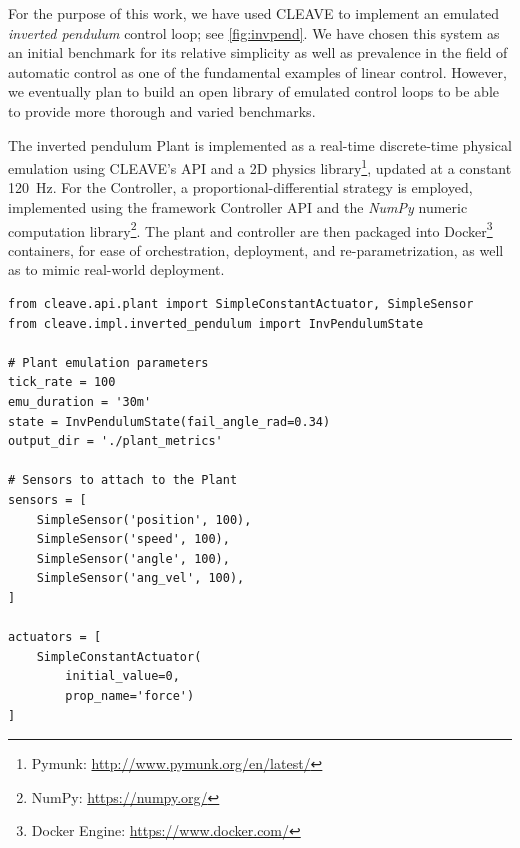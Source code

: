 For the purpose of this work, we have used \ac{CLEAVE} to implement an emulated \emph{inverted pendulum} control loop; see \cref{fig:invpend}.
We have chosen this system as an initial benchmark for its relative simplicity as well as prevalence in the field of automatic control as one of the fundamental examples of linear control.
However, we eventually plan to build an open library of emulated control loops to be able to provide more thorough and varied benchmarks.  

The inverted pendulum Plant is implemented as a real-time discrete-time physical emulation using CLEAVE's API and a 2D physics library\footnote{Pymunk: \url{http://www.pymunk.org/en/latest/}}, updated at a constant \SI{120}{\hertz}.
For the Controller, a proportional-differential strategy is employed, implemented using the framework Controller API and the \emph{NumPy} numeric computation library\footnote{NumPy: \url{https://numpy.org/}}.
The plant and controller are then packaged into Docker\footnote{Docker Engine: \url{https://www.docker.com/}} containers, for ease of orchestration, deployment, and re-parametrization, as well as to mimic real-world deployment.

\begin{listing}
    \begin{verbatim}
from cleave.api.plant import SimpleConstantActuator, SimpleSensor
from cleave.impl.inverted_pendulum import InvPendulumState

# Plant emulation parameters
tick_rate = 100
emu_duration = '30m'
state = InvPendulumState(fail_angle_rad=0.34)
output_dir = './plant_metrics'

# Sensors to attach to the Plant
sensors = [
    SimpleSensor('position', 100),
    SimpleSensor('speed', 100),
    SimpleSensor('angle', 100),
    SimpleSensor('ang_vel', 100),
]

actuators = [
    SimpleConstantActuator(
        initial_value=0,
        prop_name='force')
]
    \end{verbatim}
    \caption{
        Example configuration file for a \ac{CLEAVE} Plant, defining the parameters for a single emulation.
        ``Plant emulation parameters'' define key emulation parameters, such as the emulation discrete-time update rate (the \emph{tick rate}).
        The Sensors and Actuators are then provided in lists, each Sensor and Actuator attached to a specific property identified by a string.
        Additionally, Sensors have a sampling rate in Hz which needs to be provided as an integer.
    }
    \label{lst:config:plant}
\end{listing}